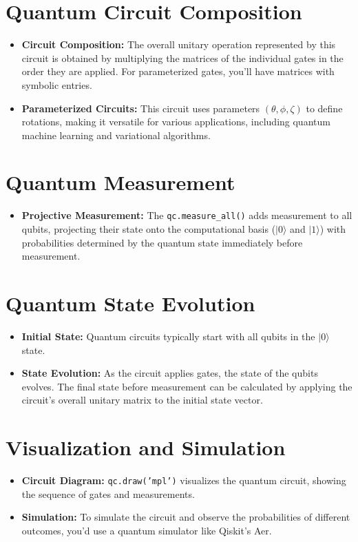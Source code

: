 \documentclass{article}
\begin{document}
\section*{Quantum Circuit Composition}

\begin{itemize}
    \item \textbf{Circuit Composition:} The overall unitary operation represented by this circuit is obtained by multiplying the matrices of the individual gates in the order they are applied. For parameterized gates, you'll have matrices with symbolic entries.
    \item \textbf{Parameterized Circuits:} This circuit uses parameters $(\theta, \phi, \zeta)$ to define rotations, making it versatile for various applications, including quantum machine learning and variational algorithms.
\end{itemize}

\section*{Quantum Measurement}

\begin{itemize}
    \item \textbf{Projective Measurement:} The \texttt{qc.measure\_all()} adds measurement to all qubits, projecting their state onto the computational basis ($|0\rangle$ and $|1\rangle$) with probabilities determined by the quantum state immediately before measurement.
\end{itemize}

\section*{Quantum State Evolution}

\begin{itemize}
    \item \textbf{Initial State:} Quantum circuits typically start with all qubits in the $|0\rangle$ state.
    \item \textbf{State Evolution:} As the circuit applies gates, the state of the qubits evolves. The final state before measurement can be calculated by applying the circuit's overall unitary matrix to the initial state vector.
\end{itemize}

\section*{Visualization and Simulation}

\begin{itemize}
    \item \textbf{Circuit Diagram:} \texttt{qc.draw('mpl')} visualizes the quantum circuit, showing the sequence of gates and measurements.
    \item \textbf{Simulation:} To simulate the circuit and observe the probabilities of different outcomes, you'd use a quantum simulator like Qiskit's Aer.
\end{itemize}
\end{document}
